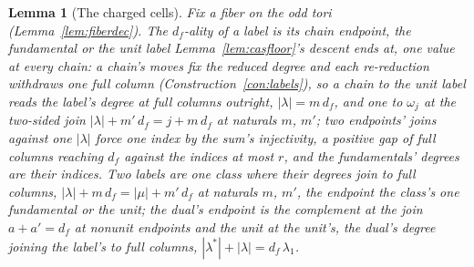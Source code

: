 \documentclass[11pt]{article}
\newtheorem{lemma}{Lemma}
\theoremstyle{definition}
\begin{document}
\begin{lemma}[The charged cells]\label{lem:chargedcell}
Fix a fiber on the odd tori (Lemma~\ref{lem:fiberdec}). The
\emph{$d_f$-ality} of a label is its chain endpoint, the fundamental
or the unit label Lemma~\ref{lem:casfloor}'s descent ends at, one
value at every chain: a chain's moves fix the reduced degree and
each re-reduction withdraws one full column
(Construction~\ref{con:labels}), so a chain to the unit label reads
the label's degree at full columns outright, $|\lambda|=m\,d_f$, and
one to $\omega_j$ at the two-sided join
$|\lambda|+m'\,d_f=j+m\,d_f$ at naturals $m$, $m'$; two endpoints'
joins
against one $|\lambda|$ force one index by the sum's injectivity,
a positive gap of full columns reaching $d_f$ against the indices at
most $r$, and the fundamentals' degrees are their indices. Two
labels are one \emph{class} where their degrees join to full
columns, $|\lambda|+m\,d_f=|\mu|+m'\,d_f$ at naturals $m$, $m'$,
the endpoint the class's one fundamental or the unit; the dual's
endpoint is the complement at the join $a+a'=d_f$ at nonunit
endpoints and the unit at the unit's, the dual's
degree joining the label's to full columns,
$|\lambda^*|+|\lambda|=d_f\,\lambda_1$.


\end{lemma}
\end{document}
